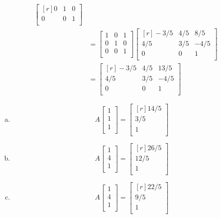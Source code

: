 \documentclass[../main.tex]{subfiles}
\begin{document}
\begin{align*}
\begin{bmatrix*}[r]
				0 & 1 & 0 \\
				0 & 0 & 1 \\
			\end{bmatrix*}
			\\&=
			\begin{bmatrix}
				1 & 0 & 1 \\
				0 & 1 & 0 \\
				0 & 0 & 1 \\
			\end{bmatrix}
			\begin{bmatrix*}[r]
				-3/5 & 4/5 & 8/5 \\
				4/5 & 3/5 & -4/5 \\
				0 & 0 & 1 \\
			\end{bmatrix*}
			\\&=
			\begin{bmatrix*}[r]
				-3/5 & 4/5 & 13/5 \\
				4/5 & 3/5 & -4/5 \\
				0 & 0 & 1 \\
			\end{bmatrix*}
		\end{align*}
\begin{enumerate}[a)]
	\item
		\[
			A
			\begin{bmatrix}
				1 \\
				1 \\
				1 \\
			\end{bmatrix}
			=
			\begin{bmatrix*}[r]
				14/5 \\
				3/5 \\
				1 \\
			\end{bmatrix*}
		\]
	\item
		\[
			A
			\begin{bmatrix}
				1 \\
				4 \\
				1 \\
			\end{bmatrix}
			=
			\begin{bmatrix*}[r]
				26/5 \\
				12/5 \\
				1 \\
			\end{bmatrix*}
		\]
	\item
		\[
			A
			\begin{bmatrix}
				1 \\
				4 \\
				1 \\
			\end{bmatrix}
			=
			\begin{bmatrix*}[r]
				22/5 \\
				9/5 \\
				1 \\
			\end{bmatrix*}
		\]
\end{enumerate}
\end{document}

